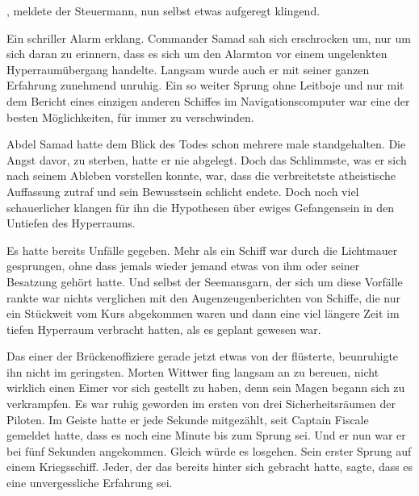 , meldete der Steuermann, nun selbst etwas aufgeregt klingend.

\par

Ein schriller Alarm erklang. Commander Samad sah sich erschrocken um, nur um sich daran zu erinnern, dass es sich um den Alarmton vor einem ungelenkten Hyperraumübergang handelte. Langsam wurde auch er mit seiner ganzen Erfahrung zunehmend unruhig. Ein so weiter Sprung ohne Leitboje und nur mit dem Bericht eines einzigen anderen Schiffes im Navigationscomputer war eine der besten Möglichkeiten, für immer zu verschwinden.

\par

Abdel Samad hatte dem Blick des Todes schon mehrere male standgehalten. Die Angst davor, zu sterben, hatte er nie abgelegt. Doch das Schlimmste, was er sich nach seinem Ableben vorstellen konnte, war, dass die verbreitetste atheistische Auffassung zutraf und sein Bewusstsein schlicht endete. Doch noch viel schauerlicher klangen für ihn die Hypothesen über ewiges Gefangensein in den Untiefen des Hyperraums.

\par

Es hatte bereits Unfälle gegeben. Mehr als ein Schiff war durch die Lichtmauer gesprungen, ohne dass jemals wieder jemand etwas von ihm oder seiner Besatzung gehört hatte. Und selbst der Seemansgarn, der sich um diese Vorfälle rankte war nichts verglichen mit den Augenzeugenberichten von Schiffe, die nur ein Stückweit vom Kurs abgekommen waren und dann eine viel längere Zeit im tiefen Hyperraum verbracht hatten, als es geplant gewesen war.

\par

Das einer der Brückenoffiziere gerade jetzt etwas von der  flüsterte, beunruhigte ihn nicht im geringsten.
\ortswechsel
Morten Wittwer fing langsam an zu bereuen, nicht wirklich einen Eimer vor sich gestellt zu haben, denn sein Magen begann sich zu verkrampfen. Es war ruhig geworden im ersten von drei Sicherheitsräumen der Piloten. Im Geiste hatte er jede Sekunde mitgezählt, seit Captain Fiscale gemeldet hatte, dass es noch eine Minute bis zum Sprung sei. Und er nun war er bei fünf Sekunden angekommen. Gleich würde es losgehen. Sein erster Sprung auf einem Kriegsschiff. Jeder, der das bereits hinter sich gebracht hatte, sagte, dass es eine unvergessliche Erfahrung sei.

